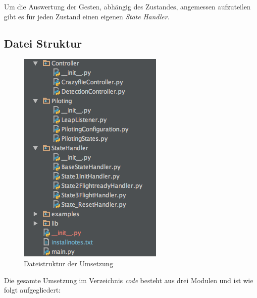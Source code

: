 Um die Auswertung der Gesten, abhängig des Zustandes, angemessen aufzuteilen gibt es für jeden Zustand einen eigenen \textit{State Handler}.

\newpage

\subsection{Datei Struktur}
\begin{figure}
	\includegraphics[width=1.0\linewidth]{figures/poc/filestructure.png}
	\caption[Dateistruktur]{Dateistruktur der Umsetzung}
\end{figure}
Die gesamte Umsetzung im Verzeichnis \textit{code} besteht aus drei Modulen und ist wie folgt aufgegliedert:

